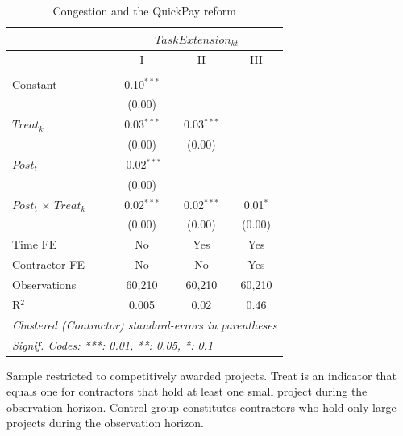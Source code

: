 \documentclass[
]{article}
\begin{document}
\begin{table}[htbp]
   \caption{Congestion and the QuickPay reform}
   \centering
   \tiny
   \begin{tabular}{lccc}
      \toprule
      \midrule  & \multicolumn{3}{c}{$TaskExtension_{kt}$}\\
      \midrule  & I & II & III\\
      \midrule \\
      Constant                     & 0.10$^{***}$  &              &   \\   
                                   & (0.00)        &              &   \\   
      $Treat_k$                    & 0.03$^{***}$  & 0.03$^{***}$ &   \\   
                                   & (0.00)        & (0.00)       &   \\   
      $Post_t$                     & -0.02$^{***}$ &              &   \\   
                                   & (0.00)        &              &   \\   
      $Post_t$ $\times$ $Treat_k$  & 0.02$^{***}$  & 0.02$^{***}$ & 0.01$^{*}$\\   
                                   & (0.00)        & (0.00)       & (0.00)\\   
      \midrule 
      Time FE                      & No            & Yes          & Yes\\  
      Contractor FE                & No            & No           & Yes\\  
      Observations                 & 60,210        & 60,210       & 60,210\\  
      R$^2$                        & 0.005         & 0.02         & 0.46\\  
      \midrule
      \multicolumn{4}{l}{\emph{Clustered (Contractor) standard-errors in parentheses}}\\
      \multicolumn{4}{l}{\emph{Signif. Codes: ***: 0.01, **: 0.05, *: 0.1}}\\
   \end{tabular}
   
   \par \raggedright 
   Sample restricted to competitively awarded projects. Treat is an indicator that equals one for contractors that hold at least one small project during the observation horizon. Control group constitutes contractors who hold only large projects during the observation horizon.
\end{table}
\end{document}

